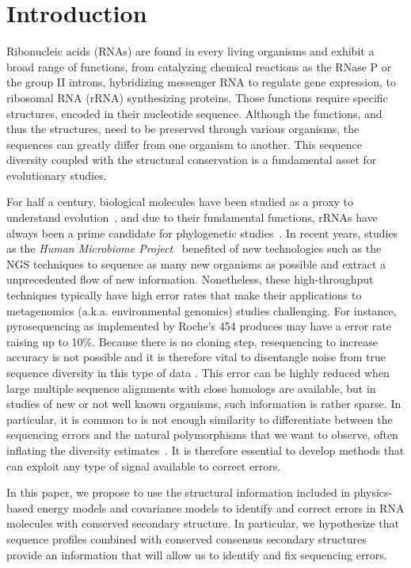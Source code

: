 \section{Introduction}
\label{sec:introduction}

Ribonucleic acids (RNAs) are found in every living organisms and exhibit a broad range of functions, from catalyzing
chemical reactions as the RNase P or the group II introns, hybridizing  messenger RNA to regulate gene expression,
to ribosomal RNA (rRNA) synthesizing proteins. Those functions  require specific structures,  encoded in their nucleotide
sequence. Although the functions, and thus the structures, need to be preserved through various organisms, the sequences
can greatly differ from one organism to another. This sequence diversity coupled with the structural conservation is a fundamental
asset for evolutionary studies.

For half a century, biological molecules have been studied as a proxy to understand evolution~\cite{Zuckerkandl1965}, and due
to their fundamental functions, rRNAs have always been a prime candidate for phylogenetic studies~\cite{Olsen1986, Olsen1993}.
In recent years, studies as the \emph{Human Microbiome Project}~\cite{Turnbaugh2007} benefited of new technologies such as the
NGS techniques to sequence as many new organisms as possible and extract a unprecedented flow of new information. 
Nonetheless, these high-throughput techniques typically have high error rates that make their applications to metagenomics (a.k.a. environmental
genomics) studies challenging. For instance, pyrosequencing as implemented by Roche's 454 produces may have a error rate raising up to 10\%.
Because there is no cloning step, resequencing to increase accuracy is not possible and it is therefore vital to disentangle noise from true sequence
diversity in this type of data \cite{Quince:2009uq}. This error can be highly reduced  when large multiple sequence alignments with close homologs
are available, but in studies of new or not well known organisms, such information is rather sparse. In particular, it is common to is not enough  similarity to 
differentiate between the sequencing errors and the natural polymorphisms that we want to observe, often inflating the diversity estimates~\cite{Kunin2010}.
It is therefore essential to develop methods that can exploit any type of signal available to correct errors.  

In this paper, we propose to use the structural information included in physics-based energy models and covariance models to identify and correct errors
in RNA molecules with conserved secondary structure. In particular, we hypothesize that sequence profiles combined with conserved consensus secondary structures provide an information that will allow us to identify and fix sequencing errors.

